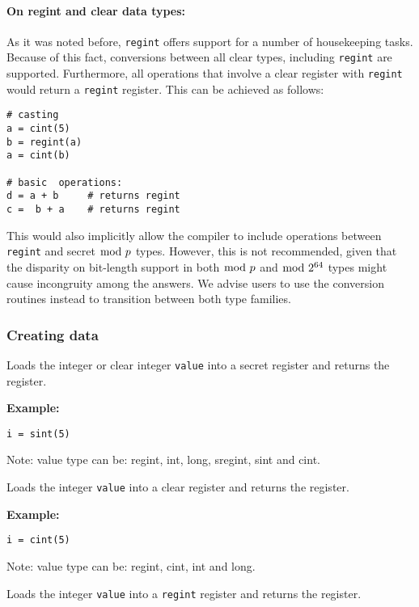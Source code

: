 \paragraph{On regint and clear data types:} As it was noted before, \verb|regint| offers support for a number of housekeeping tasks. Because of this fact, conversions between all clear types, including \verb|regint| are supported. Furthermore, all operations that involve a clear register with \verb|regint| would return a \verb|regint| register. This can be achieved as follows:
\begin{lstlisting}
# casting
a = cint(5)
b = regint(a)
a = cint(b)

# basic  operations:
d = a + b     # returns regint
c =  b + a    # returns regint
\end{lstlisting}
This would also implicitly allow the compiler to include operations between \verb|regint| and secret $\bmod \; p$ types. However, this is not recommended, given that the disparity on bit-length support in both $\bmod \; p$ and $\bmod \; 2^{64}$ types might cause incongruity among the answers. We advise users to use the conversion routines instead to transition between both type families.

\subsubsection{Creating data}
Loads the integer or clear integer \verb|value| into a secret register and returns the register.

\noindent
\textbf{Example:}
\begin{lstlisting}
i = sint(5)
\end{lstlisting}
\begin{footnotesize}
  Note: value type can be: regint, int, long, sregint, sint and cint.
\end{footnotesize}

Loads the integer \verb|value| into a clear register and returns the register.

\noindent
\textbf{Example:}
\begin{lstlisting}
i = cint(5)
\end{lstlisting}
\begin{footnotesize}
  Note: value type can be: regint, cint, int and long.
\end{footnotesize}

Loads the integer \verb|value| into a \verb|regint| register and returns
the register.

